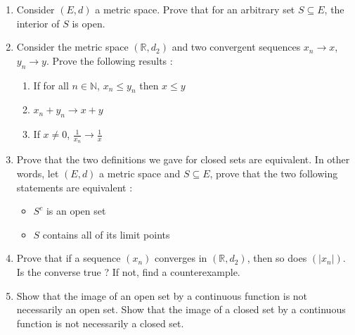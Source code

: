 \documentclass[11pt,letterpaper]{scrartcl}
\newcommand{\reals}{\mathbb{R}}
\newcommand{\naturals}{\mathbb{N}}
\begin{document}
\begin{enumerate}
	\item Consider $(E,d)$ a metric space. Prove that for an arbitrary set $S \subseteq E$, the interior of $S$ is open.

	\item Consider the metric space $(\reals,d_2)$ and two convergent sequences $x_n \rightarrow x$, $y_n \rightarrow y$. Prove the following results :
	\begin{enumerate}[label=\alph*.]
		\item If for all $n \in \naturals$, $x_n \leq y_n$ then $x \leq y$
		\item $x_n + y_n \rightarrow x + y$
		\item If $x \neq 0$, $\frac{1}{x_n} \rightarrow \frac{1}{x}$
	\end{enumerate}

	\item Prove that the two definitions we gave for closed sets are equivalent. In other words, let $(E,d)$ a metric space and $S \subseteq E$, prove that the two following statements are equivalent :
	\begin{itemize}
		\item $S^c$ is an open set
		\item $S$ contains all of its limit points
	\end{itemize}

	\item Prove that if a sequence $(x_n)$ converges in $(\reals,d_2)$, then so does $(|x_n|)$. Is the converse true ? If not, find a counterexample.

	\item Show that the image of an open set by a continuous function is not necessarily an open set. Show that the image of a closed set by a continuous function is not necessarily a closed set.  
	

\end{enumerate}
\end{document}
